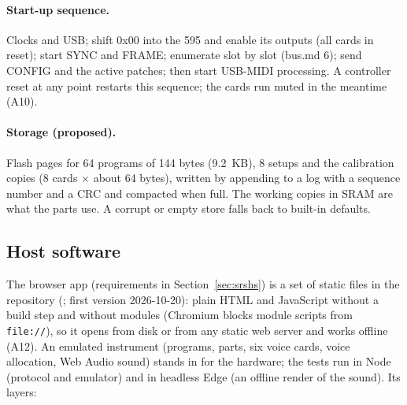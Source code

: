 \paragraph{Start-up sequence.} Clocks and USB; shift 0x00 into the 595 and enable its outputs (all cards in reset);
start SYNC and FRAME; enumerate slot by slot (bus.md 6); send CONFIG and the active patches; then start USB-MIDI
processing. A controller reset at any point restarts this sequence; the cards run muted in the meantime (A10).

\paragraph{Storage (proposed).} Flash pages for 64 programs of 144 bytes (\SI{9.2}{KB}), 8 setups and the
calibration copies (8 cards $\times$ about 64 bytes), written by appending to a log with a sequence number and a CRC
and compacted when full. The working copies in SRAM are what the parts use. A corrupt or empty store falls back to
built-in defaults.

\subsection{Host software}\label{sec:sadhs}

The browser app (requirements in Section~\ref{sec:srshs}) is a set of static files in the repository (;
first version 2026-10-20): plain HTML and JavaScript without a build step and without modules (Chromium blocks
module scripts from \texttt{file://}), so it opens from disk or from any static web server and works offline (A12).
An emulated instrument (programs, parts, six voice cards, voice allocation, Web Audio sound) stands in for the
hardware; the tests run in Node (protocol and emulator) and in headless Edge (an offline render of the sound). Its
layers:

